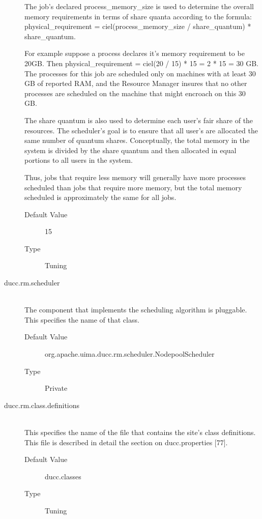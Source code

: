 \begin{description}
          The job's declared process\_memory\_size is used to determine the overall memory 
          requirements in terms of share quanta according to the formula: physical\_requirement = 
          ciel(process\_memory\_size / share\_quantum) * share\_quantum. 
          
          For example suppose a process declares it's memory requirement to be 20GB. Then 
          physical\_requirement = ciel(20 / 15) * 15 = 2 * 15 = 30 GB. The processes for this job 
          are scheduled only on machines with at least 30 GB of reported RAM, and the Resource 
          Manager insures that no other processes are scheduled on the machine that might encroach 
          on this 30 GB. 
          
          The share quantum is also used to determine each user's fair share of the resources. The 
          scheduler's goal is to ensure that all user's are allocated the same number of quantum 
          shares. Conceptually, the total memory in the system is divided by the share quantum and 
          then allocated in equal portions to all users in the system. 
          
          Thus, jobs that require less memory will generally have more processes scheduled than 
          jobs that require more memory, but the total memory scheduled is approximately the same 
          for all jobs. 
          
          \begin{description}
            \item[Default Value] 15 
            \item[Type] Tuning 
          \end{description}

        \item[ducc.rm.scheduler] \hfill \\
          The component that implements the scheduling algorithm is pluggable. This specifies the 
          name of that class. 
          \begin{description}
            \item[Default Value] org.apache.uima.ducc.rm.scheduler.NodepoolScheduler 
            \item[Type] Private
          \end{description} 
          
        \item[ducc.rm.class.definitions] \hfill \\
          This specifies the name of the file that contains the site's class definitions. This file is 
          described in detail the section on ducc.properties [77]. 
          \begin{description}
            \item[Default Value] ducc.classes 
            \item[Type] Tuning 
          \end{description}
          

\end{description}
